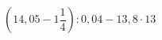 \begin{ex}[type=calculate]
	\begin{condition}
		\( \left( 14,05-1\dfrac{1}{4} \right):0,04-13,8\cdot13 \)
	\end{condition}
\end{ex}